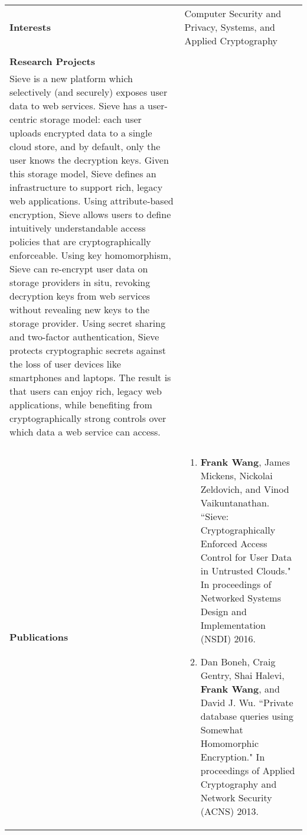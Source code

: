\documentclass[a4paper,10pt]{article}
\begin{document}
\begin{longtable}{ p{0.9in} l }
\textbf{Interests} & Computer Security and Privacy, Systems, and Applied Cryptography \\ \\
\textbf{Research Projects} & \begin{minipage}[t]{0.78 \columnwidth}
\textbf{Cryptographically Enforced Access Control for User Data in
Untrusted Clouds}. \\ Sieve is a new platform which
selectively (and securely) exposes user data to web services.
Sieve has a user-centric storage model: each user
uploads encrypted data to a single cloud store, and by
default, only the user knows the decryption keys. Given
this storage model, Sieve defines an infrastructure to support
rich, legacy web applications. Using attribute-based
encryption, Sieve allows users to define intuitively understandable
access policies that are cryptographically
enforceable. Using key homomorphism, Sieve can re-encrypt
user data on storage providers in situ, revoking
decryption keys from web services without revealing new
keys to the storage provider. Using secret sharing and
two-factor authentication, Sieve protects cryptographic
secrets against the loss of user devices like smartphones
and laptops. The result is that users can enjoy rich, legacy
web applications, while benefiting from cryptographically
strong controls over which data a web service can access. \\
\end{minipage} \tabularnewline

\textbf{Publications} & \begin{minipage}[t]{0.78 \textwidth} 
\begin{enumerate}[leftmargin=*]
\setlength{\itemsep}{7pt}
                \setlength{\parskip}{0pt}
                \setlength{\parsep}{0pt}

\item{\textbf{Frank Wang}, James Mickens, Nickolai Zeldovich, and  Vinod Vaikuntanathan. ``Sieve: Cryptographically Enforced Access Control for User Data in Untrusted Clouds." In proceedings of Networked Systems Design and Implementation (NSDI) 2016.}
               
\item{Dan Boneh, Craig Gentry, Shai Halevi, \textbf{Frank Wang}, and David J. Wu. ``Private database queries using Somewhat Homomorphic Encryption." In proceedings of Applied Cryptography and Network Security (ACNS) 2013.}


\end{enumerate}
\end{minipage}
\end{longtable}
\end{document}
